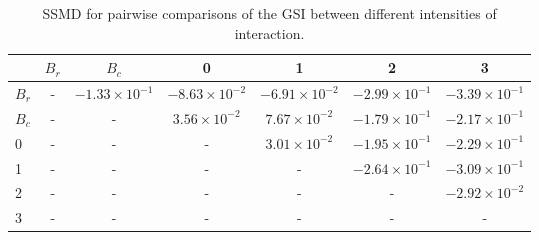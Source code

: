 \begin{table}
\centering
\caption{SSMD for pairwise comparisons of the GSI between different intensities of interaction.}
\label{tab:ssmd_gsi}
\begin{tabular}{lcccccc}
\toprule
 & $B_r$ & $B_c$ & 0 & 1 & 2 & 3 \\
\midrule
$B_r$ & - & $-1.33 \times 10^{-1}$ & $-8.63 \times 10^{-2}$ & $-6.91 \times 10^{-2}$ & $-2.99 \times 10^{-1}$ & $-3.39 \times 10^{-1}$ \\
$B_c$ & - & - & $3.56 \times 10^{-2}$ & $7.67 \times 10^{-2}$ & $-1.79 \times 10^{-1}$ & $-2.17 \times 10^{-1}$ \\
0 & - & - & - & $3.01 \times 10^{-2}$ & $-1.95 \times 10^{-1}$ & $-2.29 \times 10^{-1}$ \\
1 & - & - & - & - & $-2.64 \times 10^{-1}$ & $-3.09 \times 10^{-1}$ \\
2 & - & - & - & - & - & $-2.92 \times 10^{-2}$ \\
3 & - & - & - & - & - & - \\
\bottomrule
\end{tabular}
\end{table}
